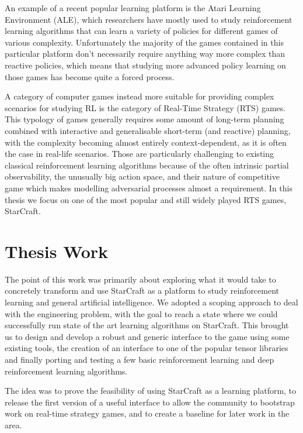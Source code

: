 An example of a recent popular learning platform is the Atari Learning
Environment (ALE), which researchers have mostly used to study reinforcement
learning algorithms that can learn a variety of policies for different games of
various complexity. Unfortunately the majority of the games contained in this
particular platform don't necessarily require anything way more complex than
reactive policies, which means that studying more advanced policy learning on
those games has become quite a forced process.

A category of computer games instead more suitable for providing complex
scenarios for studying RL is the category of Real-Time Strategy (RTS) games.
This typology of games generally requires some amount of long-term planning
combined with interactive and generalisable short-term (and reactive) planning,
with the complexity becoming almost entirely context-dependent, as it is often
the case in real-life scenarios. Those are particularly challenging to existing
classical reinforcement learning algorithms because of the often intrinsic
partial observability, the unusually big action space, and their nature of
competitive game which makes modelling adversarial processes almost a
requirement. In this thesis we focus on one of the most popular and still widely
played RTS games, StarCraft.


\section{Thesis Work} %

The point of this work was primarily about exploring what it would take to
concretely transform and use StarCraft as a platform to study reinforcement
learning and general artificial intelligence. We adopted a scoping approach to
deal with the engineering problem, with the goal to reach a state where we could
successfully run state of the art learning algorithms on StarCraft. This brought
us to design and develop a robust and generic interface to the game using some
existing tools, the creation of an interface to one of the popular tensor
libraries and finally porting and testing a few basic reinforcement learning and
deep reinforcement learning algorithms.

The idea was to prove the feasibility of using StarCraft as a learning platform,
to release the first version of a useful interface to allow the community to
bootstrap work on real-time strategy games, and to create a baseline for later
work in the area.

